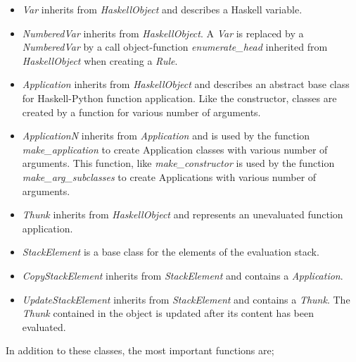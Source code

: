 \begin{itemize}
\item \emph{Var} inherits from \emph{HaskellObject} and describes a Haskell variable. 

\item \emph{NumberedVar} inherits from \emph{HaskellObject}. A \emph{Var} is replaced
by a \emph{NumberedVar} by a call object-function \emph{enumerate\_head} inherited from
\emph{HaskellObject} when creating a \emph{Rule}.

\item \emph{Application} inherits from \emph{HaskellObject} and describes an
abstract base class for Haskell-Python function application. Like the constructor,
classes are created by a function for various number of arguments.

\item \emph{ApplicationN} inherits from \emph{Application} and is used by the function
\emph{make\_application} to create Application classes with various number of arguments.
This function, like \emph{make\_constructor} is used by the function 
\emph{make\_arg\_subclasses} to create Applications with various number of arguments.

\item \emph{Thunk} inherits from \emph{HaskellObject} and represents an unevaluated
function application. 

\item \emph{StackElement} is a base class for the elements of the evaluation stack.

\item \emph{CopyStackElement} inherits from \emph{StackElement} and contains a
\emph{Application}.

\item \emph{UpdateStackElement} inherits from \emph{StackElement} and contains a
\emph{Thunk}. The \emph{Thunk} contained in the object is updated after its 
content has been evaluated.
\end{itemize}

In addition to these classes, the most important functions are;

